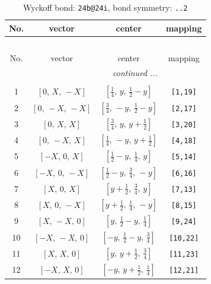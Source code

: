 \documentclass[fleqn,8pt]{jsarticle}
\begin{document}
\renewcommand{\arraystretch}{1.2}
\begin{longtable}{cccc}
\caption{Wyckoff bond: {\tt 24b@24i}, bond symmetry: {\tt ..2}}
 \\
 \hline \hline
No. & vector & center & mapping \\ \hline \endfirsthead

\multicolumn{3}{l}{\tablename\ \thetable{}} \\
 \hline \hline
No. & vector & center & mapping \\ \hline \endhead

 \hline \hline
\multicolumn{3}{r}{\footnotesize\it continued ...} \\ \endfoot

 \hline \hline
\multicolumn{3}{r}{} \\ \endlastfoot

1 & $\left[ 0,\, X,\, - X \right]$ & $\left[ \frac{1}{4},\, y,\, \frac{1}{2} - y \right]$ & {\tt [1,19]} \\ \hline
2 & $\left[ 0,\, - X,\, - X \right]$ & $\left[ \frac{3}{4},\, - y,\, \frac{1}{2} - y \right]$ & {\tt [2,17]} \\ \hline
3 & $\left[ 0,\, X,\, X \right]$ & $\left[ \frac{3}{4},\, y,\, y + \frac{1}{2} \right]$ & {\tt [3,20]} \\ \hline
4 & $\left[ 0,\, - X,\, X \right]$ & $\left[ \frac{1}{4},\, - y,\, y + \frac{1}{2} \right]$ & {\tt [4,18]} \\ \hline
5 & $\left[ - X,\, 0,\, X \right]$ & $\left[ \frac{1}{2} - y,\, \frac{1}{4},\, y \right]$ & {\tt [5,14]} \\ \hline
6 & $\left[ - X,\, 0,\, - X \right]$ & $\left[ \frac{1}{2} - y,\, \frac{3}{4},\, - y \right]$ & {\tt [6,16]} \\ \hline
7 & $\left[ X,\, 0,\, X \right]$ & $\left[ y + \frac{1}{2},\, \frac{3}{4},\, y \right]$ & {\tt [7,13]} \\ \hline
8 & $\left[ X,\, 0,\, - X \right]$ & $\left[ y + \frac{1}{2},\, \frac{1}{4},\, - y \right]$ & {\tt [8,15]} \\ \hline
9 & $\left[ X,\, - X,\, 0 \right]$ & $\left[ y,\, \frac{1}{2} - y,\, \frac{1}{4} \right]$ & {\tt [9,24]} \\ \hline
10 & $\left[ - X,\, - X,\, 0 \right]$ & $\left[ - y,\, \frac{1}{2} - y,\, \frac{3}{4} \right]$ & {\tt [10,22]} \\ \hline
11 & $\left[ X,\, X,\, 0 \right]$ & $\left[ y,\, y + \frac{1}{2},\, \frac{3}{4} \right]$ & {\tt [11,23]} \\ \hline
12 & $\left[ - X,\, X,\, 0 \right]$ & $\left[ - y,\, y + \frac{1}{2},\, \frac{1}{4} \right]$ & {\tt [12,21]} \\
\end{longtable}
\end{document}
